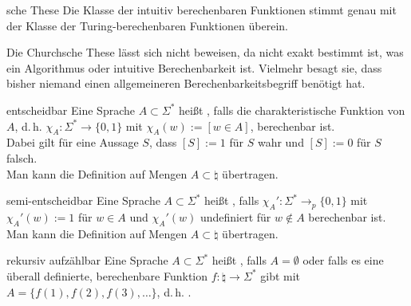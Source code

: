 \begin{Satz}{sche These}
    Die Klasse der intuitiv berechenbaren Funktionen stimmt genau mit der Klasse der
    Turing-berechenbaren Funktionen überein.
\end{Satz}

\begin{Bem}
    Die Churchsche These lässt sich nicht beweisen, da nicht exakt bestimmt ist, was ein
    Algorithmus oder intuitive Berechenbarkeit ist.
    Vielmehr besagt sie, dass bisher niemand einen allgemeineren Berechenbarkeitsbegriff benötigt
    hat.
\end{Bem}

\linie

\begin{Def}{entscheidbar}
    Eine Sprache $A \subset \Sigma^\ast$ heißt ,
    falls die charakteristische Funktion von $A$, d.\,h.
    $\chi_A\colon \Sigma^\ast \rightarrow \{0, 1\}$ mit $\chi_A(w) := [w \in A]$,
    berechenbar ist.\\
    Dabei gilt für eine Aussage $S$, dass $[S] := 1$ für $S$ wahr und $[S] := 0$ für $S$ falsch.\\
    Man kann die Definition auf Mengen $A \subset \natural$ übertragen.
\end{Def}

\begin{Def}{semi-entscheidbar}
    Eine Sprache $A \subset \Sigma^\ast$ heißt ,
    falls $\chi_A'\colon \Sigma^\ast \rightarrow_p \{0, 1\}$ mit $\chi_A'(w) := 1$ für $w \in A$
    und $\chi_A'(w)$ undefiniert für $w \notin A$ berechenbar ist.\\
    Man kann die Definition auf Mengen $A \subset \natural$ übertragen.
\end{Def}

\begin{Def}{rekursiv aufzählbar}
    Eine Sprache $A \subset \Sigma^\ast$ heißt ,
    falls $A = \emptyset$ oder falls es eine überall definierte, berechenbare Funktion
    $f\colon \natural \rightarrow \Sigma^\ast$ gibt mit $A = \{f(1), f(2), f(3), \dotsc\}$,
    d.\,h. .
\end{Def}

\linie

